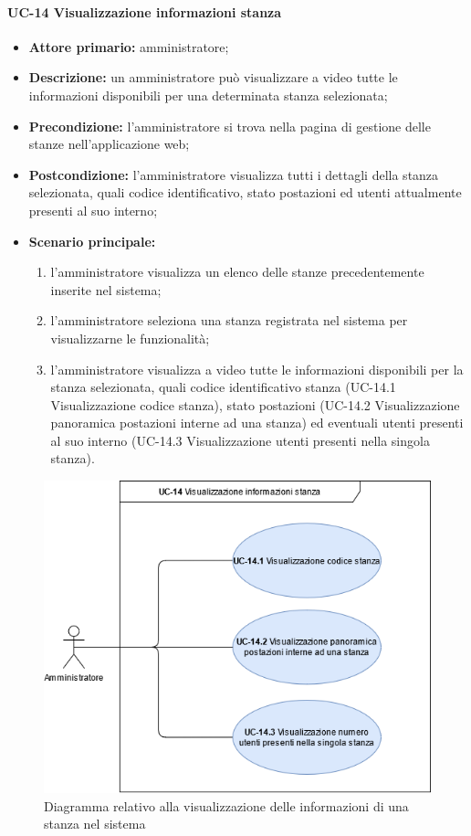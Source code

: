\paragraph{UC-14 Visualizzazione informazioni stanza}
\begin{itemize}
    \item \textbf{Attore primario:} amministratore;
    \item \textbf{Descrizione:} un amministratore pu\`{o} visualizzare a video tutte le informazioni disponibili per una determinata stanza selezionata;
    \item \textbf{Precondizione:} l'amministratore si trova nella pagina di gestione delle stanze nell'applicazione web;
    \item \textbf{Postcondizione:} l'amministratore visualizza tutti i dettagli della stanza selezionata, quali codice identificativo, stato postazioni ed utenti attualmente presenti al suo interno;
    \item \textbf{Scenario principale:}
    \begin{enumerate}
        \item l'amministratore visualizza un elenco delle stanze precedentemente inserite nel sistema;
        \item l'amministratore seleziona una stanza registrata nel sistema per visualizzarne le funzionalità;
        \item l'amministratore visualizza a video tutte le informazioni disponibili per la stanza selezionata, quali codice identificativo stanza (UC-14.1 Visualizzazione codice stanza), stato postazioni (UC-14.2 Visualizzazione panoramica postazioni interne ad una stanza) ed eventuali utenti presenti al suo interno (UC-14.3 Visualizzazione utenti presenti nella singola stanza).
    \end{enumerate}
\end{itemize}

\begin{figure}[H]
    \centering
      \includegraphics[scale=0.50]{src/CasiDUso/immagini/InformazioniStanza.png}
    \caption{Diagramma relativo alla visualizzazione delle informazioni di una stanza nel sistema}
\end{figure}

